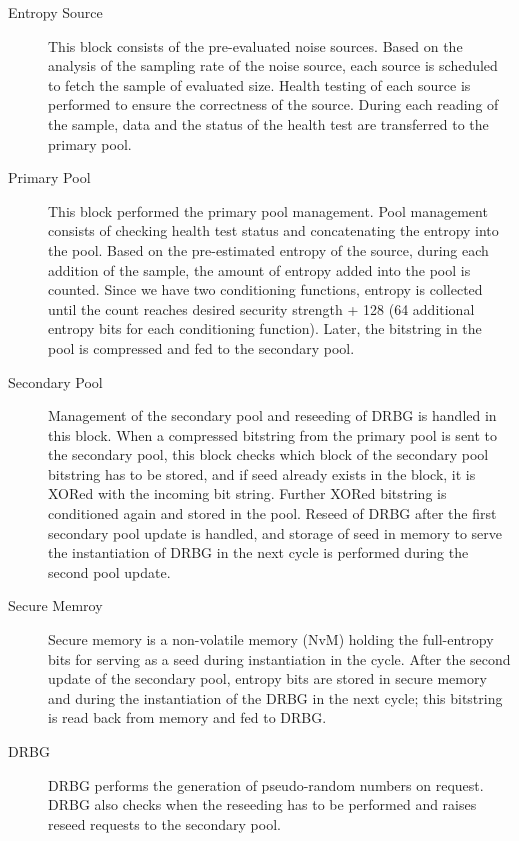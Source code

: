 \begin{description}
	\item[Entropy Source] This block consists of the pre-evaluated noise sources. Based on the analysis of the sampling rate of the noise source, each source is scheduled to fetch the sample of evaluated size. Health testing of each source is performed to ensure the correctness of the source. During each reading of the sample, data and the status of the health test are transferred to the primary pool.
	
	\item[Primary Pool] This block performed the primary pool management. Pool management consists of checking health test status and concatenating the entropy into the pool. Based on the pre-estimated entropy of the source, during each addition of the sample, the amount of entropy added into the pool is counted. Since we have two conditioning functions, entropy is collected until the count reaches desired security strength + 128 (64 additional entropy bits for each conditioning function). Later, the bitstring in the pool is compressed and fed to the secondary pool.

	\item[Secondary Pool] Management of the secondary pool and reseeding of DRBG is handled in this block. When a compressed bitstring from the primary pool is sent to the secondary pool, this block checks which block of the secondary pool bitstring has to be stored, and if seed already exists in the block, it is XORed with the incoming bit string. Further XORed bitstring is conditioned again and stored in the pool. Reseed of DRBG after the first secondary pool update is handled, and storage of seed in memory to serve the instantiation of DRBG in the next cycle is performed during the second pool update.
	
	\item[Secure Memroy] Secure memory is a non-volatile memory (NvM) holding the full-entropy bits for serving as a seed during instantiation in the cycle. After the second update of the secondary pool, entropy bits are stored in secure memory and during the instantiation of the DRBG in the next cycle; this bitstring is read back from memory and fed to DRBG.
	
	\item[DRBG] DRBG performs the generation of pseudo-random numbers on request. DRBG also checks when the reseeding has to be performed and raises reseed requests to the secondary pool.
	 
\end{description}

